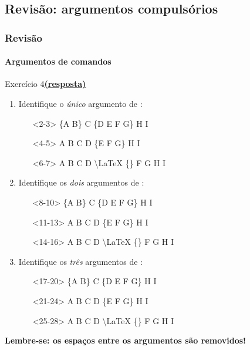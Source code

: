 \documentclass[handout,10pt]{beamer}
\begin{document}
\subsection{Revisão: argumentos compulsórios}
\begin{frame}[fragile]
	\frametitle{Revisão}
	\framesubtitle{Argumentos de comandos}
	
		\begin{block}{Exercício 4\hfill \hyperlink{respostas}{\footnotesize\textbf{(resposta)}}}	
			\begin{enumerate}
			\item<1-7> Identifique o \emph{único} argumento de :
	
				\begin{itemize}\bfseries
					\item[]<2-3> \{A B\} C  \{{\color<3>{red}D E F G}\} H I
					\item[]<4-5> A B C  {D} \{E F G\} H I
					\item[]<6-7> A B C  {D} {\sffamily\textbackslash LaTeX} \{\} F G H I
				\end{itemize}
			
			\item<8-16> Identifique os \emph{dois} argumentos de :
	
				\begin{itemize}\bfseries
					\item[]<8-10> \{A B\} C  \{{\color<9>{red}D E F G}\} {H} I
					\item[]<11-13> A B C  {\color<12>{red}D} \{{E F G}\} H I
					\item[]<14-16> A B C  {\color<15>{red}D} {\sffamily\textbackslash LaTeX} \{\} F G H I
				\end{itemize}
	
			\item<17-28> Identifique os \emph{três} argumentos de :
	
				\begin{itemize}\bfseries
					\item[]<17-20> \{A B\} C  \{{\color<18>{red}D E F G}\} {\color<19>{red}H} {I}
					\item[]<21-24> A B C  {D} \{{\color<23>{red}E F G}\} {H} I
					\item[]<25-28> A B C  {\color<26>{red}D} {\color<27>{red}\sffamily\textbackslash LaTeX} {\{\}} F G H I
				\end{itemize}
			\end{enumerate}
		\end{block}
		
		\vfill
		
		\begin{center}
			\bfseries
			\textbf{Lembre-se:} os espaços entre os argumentos são removidos!
		\end{center}
		
\end{frame}
\end{document}
